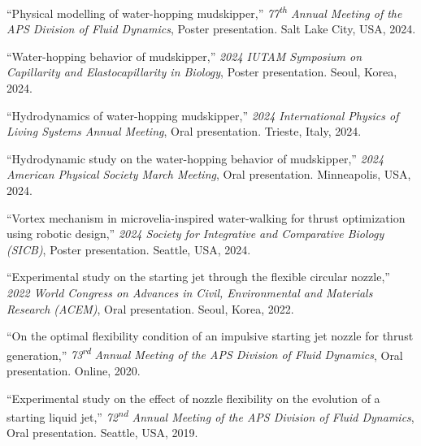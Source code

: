 \begin{pubSubsectionNum}
  \item ``Physical modelling of water-hopping mudskipper,''
        \textit{77\textsuperscript{th} Annual Meeting of the APS Division of Fluid Dynamics},
        Poster presentation.
        \textcolor{BrickRed}{Salt Lake City, USA}, 2024.

  \item ``Water-hopping behavior of mudskipper,''
        \textit{2024 IUTAM Symposium on Capillarity and Elastocapillarity in Biology},
        Poster presentation.
        \textcolor{BrickRed}{Seoul, Korea}, 2024.

  \item ``Hydrodynamics of water-hopping mudskipper,''
        \textit{2024 International Physics of Living Systems Annual Meeting},
        Oral presentation.
        \textcolor{BrickRed}{Trieste, Italy}, 2024.

  \item ``Hydrodynamic study on the water-hopping behavior of mudskipper,''
        \textit{2024 American Physical Society March Meeting},
        Oral presentation.
        \textcolor{BrickRed}{Minneapolis, USA}, 2024.

  \item ``Vortex mechanism in microvelia-inspired water-walking for thrust optimization
        using robotic design,''
        \textit{2024 Society for Integrative and Comparative Biology (SICB)},
        Poster presentation.
        \textcolor{BrickRed}{Seattle, USA}, 2024.

  \item ``Experimental study on the starting jet through the flexible circular nozzle,''
        \textit{2022 World Congress on Advances in Civil, Environmental and Materials Research (ACEM)},
        Oral presentation.
        \textcolor{BrickRed}{Seoul, Korea}, 2022.

  \item ``On the optimal flexibility condition of an impulsive starting jet nozzle
        for thrust generation,''
        \textit{73\textsuperscript{rd} Annual Meeting of the APS Division of Fluid Dynamics},
        Oral presentation.
        \textcolor{BrickRed}{Online}, 2020.

  \item ``Experimental study on the effect of nozzle flexibility on the evolution
        of a starting liquid jet,''
        \textit{72\textsuperscript{nd} Annual Meeting of the APS Division of Fluid Dynamics},
        Oral presentation.
        \textcolor{BrickRed}{Seattle, USA}, 2019.


\end{pubSubsectionNum}

